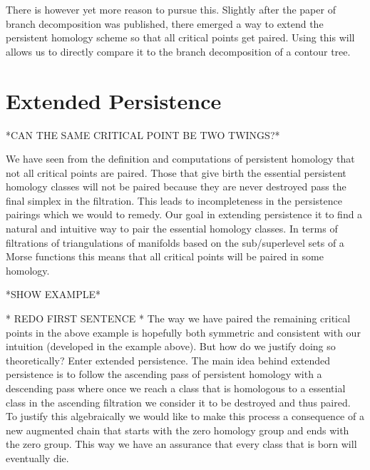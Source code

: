 There is however yet more reason to pursue this. Slightly after the paper of branch decomposition was published, there emerged a way to extend the persistent homology scheme so that all critical points get paired. Using this will allows us to directly compare it to the branch decomposition of a contour tree. 





\section{Extended Persistence}

*CAN THE SAME CRITICAL POINT BE TWO TWINGS?*

We have seen from the definition and computations of persistent homology that not all critical points are paired. Those that give birth the essential persistent homology classes will not be paired because they are never destroyed pass the final simplex in the filtration. This leads to incompleteness in the persistence pairings which we would to remedy. Our goal in extending persistence it to find a natural and intuitive way to pair the essential homology classes. In terms of filtrations of triangulations of manifolds based on the sub/superlevel sets of a Morse functions this means that all critical points will be paired in some homology.

*SHOW EXAMPLE*

* REDO FIRST SENTENCE *
The way we have paired the remaining critical points in the above example is hopefully both symmetric and consistent with our intuition (developed in the example above). But how do we justify doing so theoretically? Enter extended persistence. The main idea behind extended persistence is to follow the ascending pass of persistent homology with a descending pass where once we reach a class that is homologous to a essential class in the ascending filtration we consider it to be destroyed and thus paired. To justify this algebraically we would like to make this process a consequence of a new augmented chain that starts with the zero homology group and ends with the zero group. This way we have an assurance that every class that is born will eventually die.

